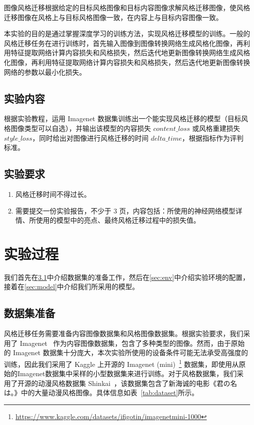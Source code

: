 \documentclass[UTF8,openany]{ctexbook}
\begin{document}
图像风格迁移根据给定的目标风格图像和目标内容图像求解风格迁移图像，使风格迁移图像在风格上与目标风格图像一致，在内容上与目标内容图像一致。

本实验的目的是通过掌握深度学习的训练方法，实现风格迁移模型的训练。一般的风格迁移任务在进行训练时，首先输入图像到图像转换网络生成风格化图像，再利用特征提取网络计算内容损失和风格损失，然后迭代地更新图像转换网络生成风格化图像，再利用特征提取网络计算内容损失和风格损失，然后迭代地更新图像转换网络的参数以最小化损失。

\section{实验内容}

根据实验教程，运用 Imagenet 数据集训练出一个能实现风格迁移的模型（目标风格图像类型可以自选），并输出该模型的内容损失 $content\_loss$ 或风格重建损失 $style\_loss$，同时给出对图像进行风格迁移的时间 $delta\_time$，根据指标作为评判标准。

\section{实验要求}

\begin{enumerate}
    \item 风格迁移时间不得过长。
    \item 需要提交一份实验报告，不少于 3 页，内容包括：所使用的神经网络模型详情、所使用的模型中的亮点、最终风格迁移过程中的损失值。
\end{enumerate}

\chapter{实验过程}

我们首先在\textsection\ref{sec:dataset}中介绍数据集的准备工作，然后在\textsection\ref{sec:env}中介绍实验环境的配置，接着在\textsection\ref{sec:model}中介绍我们所采用的模型。

\section{数据集准备}
\label{sec:dataset}

风格迁移任务需要准备内容图像数据集和风格图像数据集。根据实验要求，我们采用了 Imagenet~\cite{deng2009imagenet} 作为内容图像数据集，包含了多种类型的图像。然而，由于原始的 Imagenet 数据集十分庞大，本次实验所使用的设备条件可能无法承受高强度的训练，因此我们采用了 Kaggle 上开源的 Imagenet (mini)~\footnote{\url{https://www.kaggle.com/datasets/ifigotin/imagenetmini-1000}} 数据集，即使用从原始的Imagenet数据集中采样的小型数据集来进行训练。对于风格数据集，我们采用了开源的动漫风格数据集 Shinkai~\cite{Liu2024dtgan}，该数据集包含了新海诚的电影《君の名は。》中的大量动漫风格图像。具体信息如表~\ref{tab:dataset}所示。
\end{document}
